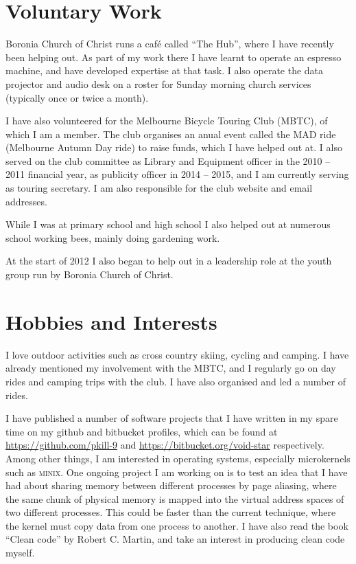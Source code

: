 \documentclass[a4paper]{article}
\begin{document}
\section{Voluntary Work}
Boronia Church of Christ runs a caf\'e called ``The Hub'', where I have
recently been helping out. As part of my work there I have learnt to
operate an espresso machine, and have developed expertise at that task. I 
also operate the data projector and audio desk on a roster for Sunday 
morning church services (typically once or twice a month).

I have also volunteered for the Melbourne Bicycle Touring Club (MBTC), of
which I am a member. The club organises an anual event called the MAD ride
(Melbourne Autumn Day ride) to raise funds, which I have helped out at. I
also served on the club committee as Library and Equipment officer in the
2010 -- 2011 financial year, as publicity officer in 2014 -- 2015, and I am
currently serving as touring secretary. I am also responsible for the club 
website and email addresses.

While I was at primary school and high school I also helped out at
numerous school working bees, mainly doing gardening work.

At the start of 2012 I also began to help out in a leadership role at the
youth group run by Boronia Church of Christ.


\section{Hobbies and Interests}
I love outdoor activities such as cross country skiing, cycling
and camping. I have already mentioned my involvement with the MBTC, and I
regularly go on day rides and camping trips with the club. I have
also organised and led a number of rides.

I have published a number of software projects that I have written in my
spare time on my github and bitbucket profiles, which can be found at
\url{https://github.com/pkill-9} and \url{https://bitbucket.org/void-star}
respectively. Among other things, I am interested in operating systems,
especially microkernels such as \textsc{minix}. One ongoing project I am
working on is to test an idea that I have had about sharing memory between
different processes by page aliasing, where the same chunk of physical 
memory is mapped into the virtual address spaces of two different processes.
This could be faster than the current technique, where the kernel must
copy data from one process to another.
I have also read the book
``Clean code'' by Robert C. Martin, and take an interest in producing clean
code myself.
\end{document}
